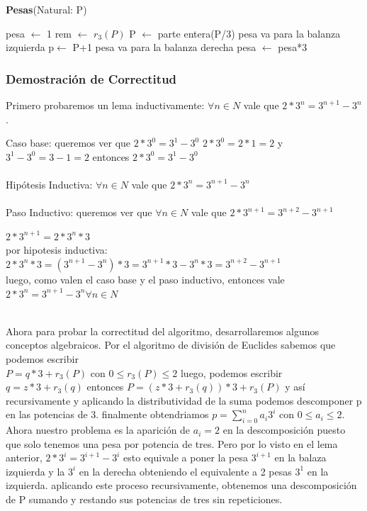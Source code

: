 \documentclass[spanish,12pt]{article}
\begin{document}
\begin{algorithm}[H]{\textbf{Pesas}(Natural: P)}
	\begin{algorithmic}[1]
		\State pesa $\gets$ 1
		 	\State rem $\gets$ $r_3 (P)$
	    		\State P $\gets $ parte entera(P/3)
	    			\State pesa va para la balanza izquierda    			\Else
	    				\State p$\gets$ P+1
	    				\State pesa va para la balanza derecha
				\EndIf
			\EndIf
			\State pesa $\gets$ pesa*3
		\endWhile
	\end{algorithmic}
\end{algorithm}



\subsubsection{Demostración de Correctitud}

Primero probaremos un lema inductivamente: 
$\forall n \in N$ vale que  $2*3^{n} = 3^{n+1}-3^{n}$.

Caso base: 
queremos ver que $2*3^{0} = 3^{1}-3^{0}$
$2*3^0 = 2*1=2$ y $3^1-3^0= 3-1=2$ entonces $2*3^{0} = 3^{1}-3^{0}$
\\
\\
Hipótesis Inductiva: 
$\forall n \in N$ vale que  $2*3^{n} = 3^{n+1}-3^{n}$
\\
\\
Paso Inductivo: 
queremos ver que $\forall n \in N$ vale que  $2*3^{n+1} = 3^{n+2}-3^{n+1}$

$2*3^{n+1} = 2*3^{n}*3 $
\\
 por hipotesis inductiva: $2*3^{n}*3 = (3^{n+1}-3^{n})*3 = 3^{n+1}*3 - 3^{n}*3= 3^{n+2}-3^{n+1} $
\\
luego, como valen el caso base y el paso inductivo, entonces vale $2*3^{n} = 3^{n+1}-3^{n} \forall n \in N $ 

\\
Ahora para probar la correctitud del algoritmo, desarrollaremos algunos conceptos algebraicos.
Por el algoritmo de división de Euclides sabemos que podemos escribir \\  $P= q*3+ r_{3}(P)$ con $0\leq r_{3}(P) \leq 2 $ luego, podemos escribir $q= z*3 + r_{3}(q)$ entonces $P= (z*3 + r_{3}(q))*3 +r_{3}(P)$ y así recursivamente y aplicando la distributividad de la suma podemos descomponer p en las potencias de 3. finalmente obtendriamos $p= \sum_{i=0}^{n}{a_i 3^{i}} $ con $0 \leq a_i \leq 2$.
Ahora nuestro problema es la aparición de $a_i=2$ en la descomposición puesto que solo tenemos una pesa por potencia de tres. Pero por lo visto en el lema anterior, $2*3^{i}= 3^{i+1}-3^{i}$ esto equivale a poner la pesa $3^{i+1}$ en la balaza izquierda y la $3^{i}$ en la derecha obteniendo el equivalente a 2 pesas $3^{1}$ en la izquierda. aplicando este proceso recursivamente, obtenemos  una descomposición de P sumando y restando sus potencias de tres sin repeticiones. 
\end{document}
